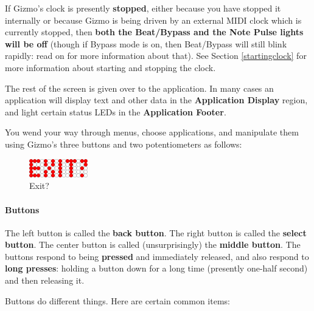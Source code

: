 \documentclass{article}
\begin{document}
If Gizmo's clock is presently {\bf stopped}, either because you have stopped it internally or because Gizmo is being driven by an external MIDI clock which is currently stopped, then {\bf both the Beat/Bypass and the Note Pulse lights will be off} (though if Bypass mode is on, then Beat/Bypass will still blink rapidly: read on for more information about that).  See Section \ref{startingclock} for more information about starting and stopping the clock.

The rest of the screen is given over to the application.  In many cases an application will display text and other data in the {\bf Application Display} region, and light certain status LEDs in the {\bf Application Footer}.

You wend your way through menus, choose applications, and manipulate them using Gizmo's three buttons and two potentiometers as follows:

\begin{figure}
\vspace{-1em}
\includegraphics[width=1in]{exit.pdf}
\caption{Exit?}
\label{exit}
\vspace{-1em}
\end{figure}

\paragraph{Buttons}  The left button is called the {\bf back button}.  The right button is called the {\bf select button}.  The center button is called (unsurprisingly) the {\bf middle button}.   The buttons respond to being {\bf pressed} and immediately released, and also respond to {\bf long presses}: holding a button down for a long time (presently one-half second) and then releasing it. 

Buttons do different things.  Here are certain common items:
\end{document}
